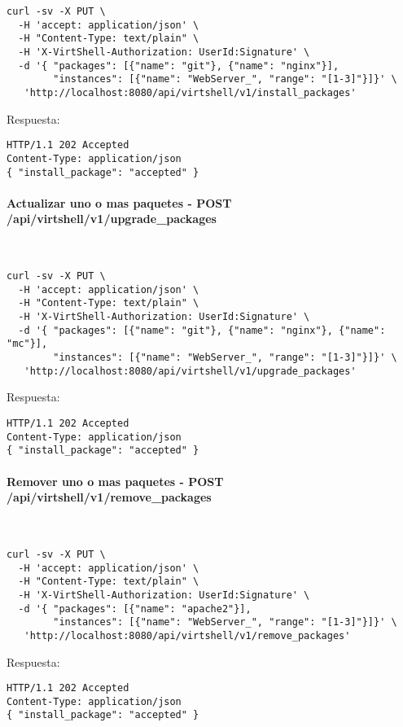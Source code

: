 \begin{lstlisting}[style=json]
curl -sv -X PUT \
  -H 'accept: application/json' \
  -H "Content-Type: text/plain" \
  -H 'X-VirtShell-Authorization: UserId:Signature' \
  -d '{ "packages": [{"name": "git"}, {"name": "nginx"}],
        "instances": [{"name": "WebServer_", "range": "[1-3]"}]}' \
   'http://localhost:8080/api/virtshell/v1/install_packages'
\end{lstlisting}

\vspace{1cm}
Respuesta:
\vspace{1cm}

\begin{lstlisting}[style=json]
HTTP/1.1 202 Accepted
Content-Type: application/json
{ "install_package": "accepted" }
\end{lstlisting}

\paragraph{Actualizar uno o mas paquetes - POST /api/virtshell/v1/upgrade\_packages} ~\\

\begin{lstlisting}[style=json]
curl -sv -X PUT \
  -H 'accept: application/json' \
  -H "Content-Type: text/plain" \
  -H 'X-VirtShell-Authorization: UserId:Signature' \
  -d '{ "packages": [{"name": "git"}, {"name": "nginx"}, {"name": "mc"}],
        "instances": [{"name": "WebServer_", "range": "[1-3]"}]}' \
   'http://localhost:8080/api/virtshell/v1/upgrade_packages'
\end{lstlisting}

\vspace{1cm}
Respuesta:
\vspace{1cm}

\begin{lstlisting}[style=json]
HTTP/1.1 202 Accepted
Content-Type: application/json
{ "install_package": "accepted" }
\end{lstlisting}

\paragraph{Remover uno o mas paquetes - POST /api/virtshell/v1/remove\_packages} ~\\

\begin{lstlisting}[style=json]
curl -sv -X PUT \
  -H 'accept: application/json' \
  -H "Content-Type: text/plain" \
  -H 'X-VirtShell-Authorization: UserId:Signature' \
  -d '{ "packages": [{"name": "apache2"}],
        "instances": [{"name": "WebServer_", "range": "[1-3]"}]}' \
   'http://localhost:8080/api/virtshell/v1/remove_packages'
\end{lstlisting}

\vspace{1cm}
Respuesta:
\vspace{1cm}

\begin{lstlisting}[style=json]
HTTP/1.1 202 Accepted
Content-Type: application/json
{ "install_package": "accepted" }
\end{lstlisting}